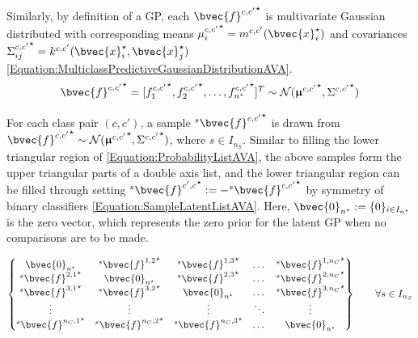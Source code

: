 				Similarly, by definition of a GP, each ${\bvec{f}^{c, c'}}^{\star}$ is multivariate Gaussian distributed with corresponding means ${\mu^{c, c'}_{i}}^{\star} = m^{c, c'}(\bvec{x}^{\star}_{i})$ and covariances ${\Sigma^{c, c'}_{ij}}^{\star} = k^{c, c'}(\bvec{x}^{\star}_{i}, \bvec{x}^{\star}_{j})$ \eqref{Equation:MulticlassPredictiveGaussianDistributionAVA}. \begin{equation}
					{\bvec{f}^{c, c'}}^{\star} = [{f^{c, c'}_{1}}^{\star}, {f^{c, c'}_{2}}^{\star}, \dots, {f^{c, c'}_{n^{\star}}}^{\star}]^{T} \sim \mathcal{N}({\vec{\upmu}^{c, c'}}^{\star}, {\Sigma^{c, c'}}^{\star})
				\label{Equation:MulticlassPredictiveGaussianDistributionAVA}
				\end{equation}
				
				For each class pair $(c, c')$, a sample ${^{s}}{\bvec{f}^{c, c'}}^{\star}$ is drawn from ${\bvec{f}^{c, c'}}^{\star} \sim \mathcal{N}({\vec{\upmu}^{c, c'}}^{\star}, {\Sigma^{c, c'}}^{\star})$, where $s \in I_{n_{S}}$. Similar to filling the lower triangular region of \eqref{Equation:ProbabilityListAVA}, the above samples form the upper triangular parts of a double axis list, and the lower triangular region can be filled through setting ${^{s}}{\bvec{f}^{c', c}}^{\star} := -{^{s}}{\bvec{f}^{c, c'}}^{\star}$ by symmetry of binary classifiers \eqref{Equation:SampleLatentListAVA}. Here, $\bvec{0}_{n^{\star}} := \{0\}_{i \in I_{n^{\star}}}$ is the zero vector, which represents the zero prior for the latent GP when no comparisons are to be made.
				
				\begin{equation}
					\begin{Bmatrix*}
						\bvec{0}_{n^{\star}} & {^{s}}{\bvec{f}^{1, 2}}^{\star} & {^{s}}{\bvec{f}^{1, 3}}^{\star} & \dots & {^{s}}{\bvec{f}^{1, n_{C}}}^{\star} \\
						{^{s}}{\bvec{f}^{2, 1}}^{\star} & \bvec{0}_{n^{\star}} & {^{s}}{\bvec{f}^{2, 3}}^{\star} & \dots & {^{s}}{\bvec{f}^{2, n_{C}}}^{\star} \\
						{^{s}}{\bvec{f}^{3, 1}}^{\star} & {^{s}}{\bvec{f}^{3, 2}}^{\star} & \bvec{0}_{n^{\star}} & \dots & {^{s}}{\bvec{f}^{3, n_{C}}}^{\star} \\
						\vdots & \vdots & \vdots & \ddots & \vdots \\
						{^{s}}{\bvec{f}^{n_{C}, 1}}^{\star} & {^{s}}{\bvec{f}^{n_{C}, 2}}^{\star} & {^{s}}{\bvec{f}^{n_{C}, 3}}^{\star} & \dots & \bvec{0}_{n^{\star}} 
					\end{Bmatrix*} \qquad \forall s \in I_{n_{S}}
				\label{Equation:SampleLatentListAVA}
				\end{equation}
				
